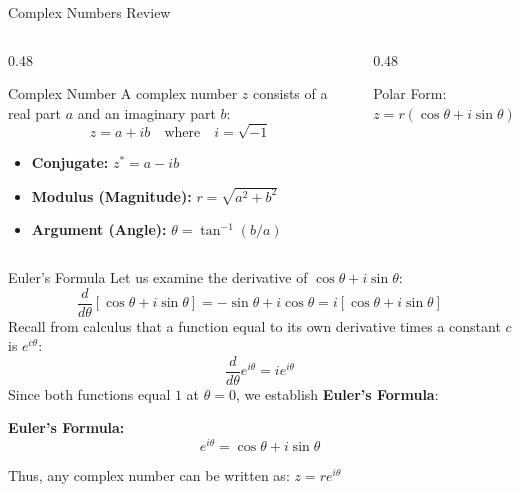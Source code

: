 \documentclass[aspectratio=169,xcolor=dvipsnames]{beamer}
\begin{document}
\begin{frame}{Complex Numbers Review}
  \begin{columns}[T]
    \begin{column}{0.48\textwidth}
      \begin{umdefinition}{Complex Number}
        A complex number $z$ consists of a real part $a$ and an imaginary part $b$:
        \[
          z = a + ib \quad \text{where} \quad i = \sqrt{-1}
        \]
      \end{umdefinition}
      \begin{itemize}
        \item \textbf{Conjugate:} $z^* = a - ib$
        \item \textbf{Modulus (Magnitude):} $r = \sqrt{a^2 + b^2}$
        \item \textbf{Argument (Angle):} $\theta = \tan^{-1}(b/a)$
      \end{itemize}
    \end{column}
    \hfill
    \begin{column}{0.48\textwidth}
      \centering
      \begin{umformula}
        \centering Polar Form: \quad $z = r(\cos\theta + i\sin\theta)$
      \end{umformula}
    \end{column}
  \end{columns}
\end{frame}

\begin{frame}{Euler's Formula}
  Let us examine the derivative of $\cos\theta + i\sin\theta$:
  \[
    \frac{d}{d\theta}[\cos\theta + i\sin\theta] = -\sin\theta + i\cos\theta = i[\cos\theta + i\sin\theta]
  \]
  \pause
  Recall from calculus that a function equal to its own derivative times a constant $c$ is $e^{c\theta}$:
  \[
    \frac{d}{d\theta} e^{i\theta} = i e^{i\theta}
  \]
  \pause
  Since both functions equal $1$ at $\theta = 0$, we establish \textbf{Euler's Formula}:
  \begin{umformula}
    \centering \textbf{Euler's Formula:}
    \begin{equation}
      \boxed{e^{i\theta} = \cos\theta + i\sin\theta}
    \end{equation}
  \end{umformula}
  Thus, any complex number can be written as: \quad $z = re^{i\theta}$
\end{frame}
\end{document}
